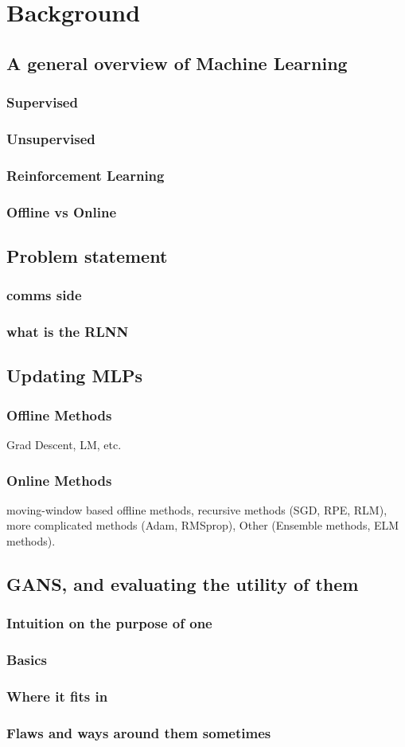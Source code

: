 \chapter{Background}
\section{A general overview of Machine Learning}
\subsection{Supervised} 
\subsection{Unsupervised}
\subsection{Reinforcement Learning}
\subsection{Offline vs Online}


\section{Problem statement}
\subsection{comms side}
\subsection{ what is the RLNN}

\section{Updating MLPs}
\subsection{Offline Methods}
Grad Descent, LM, etc.
\subsection{Online Methods}
moving-window based offline methods, recursive methods (SGD, RPE, RLM),
more complicated methods (Adam, RMSprop), 
Other (Ensemble methods, ELM methods).

\section {GANS, and evaluating the utility of them}
\subsection{Intuition on the purpose of one}
\subsection{Basics}
\subsection{ Where it fits in}
\subsection{Flaws and ways around them sometimes}

